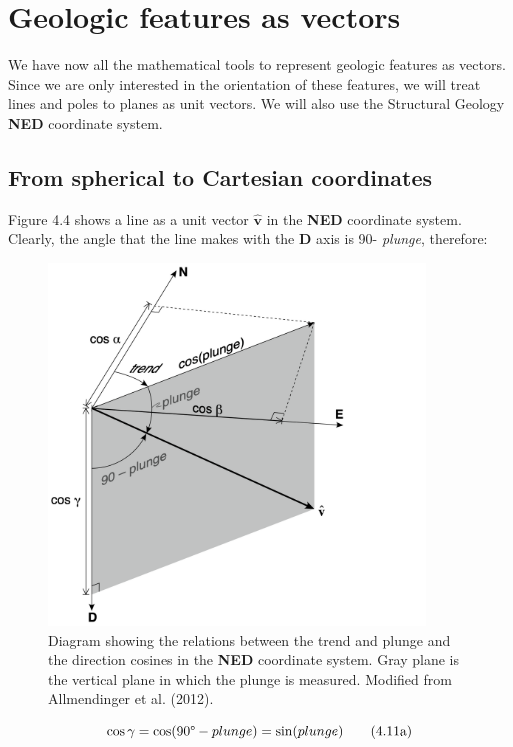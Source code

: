 \documentclass[a4paper , 12pt]{book}
\begin{document}
\section{Geologic features as vectors}

We have now all the mathematical tools to represent geologic features as vectors. Since we are only interested in the orientation of these features, we will treat lines and poles to planes as unit vectors. We will also use the Structural Geology \textbf{NED} coordinate system.

\subsection{From spherical to Cartesian coordinates}

Figure 4.4 shows a line as a unit vector $\mathbf{\hat{v}}$ in the \textbf{NED} coordinate system. Clearly, the angle that the line makes with the \textbf{D} axis is 90\degree - \textit{plunge}, therefore:

\begin{figure}[ht]
    \centering
    \includegraphics[width=10cm]{Figures/ch4f4.png}
    \caption{Diagram showing the relations between the trend and plunge and the direction cosines in the \textbf{NED} coordinate system. Gray plane is the vertical plane in which the plunge is measured. Modified from Allmendinger et al. (2012).}
\end{figure}

\begin{equation}
    \cos\gamma=\cos(90\degree-plunge)=\sin(plunge) \tag{4.11a}
\end{equation}
\end{document}
